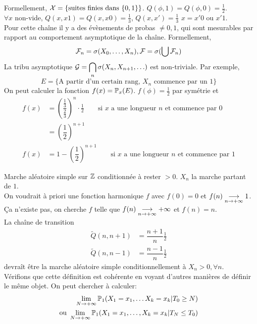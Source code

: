 \documentclass[]{report}
\begin{document}
\begin{ex}{}{}
        Formellement, $\mathcal{X}=\{\text{suites finies dans }\{0,1\}\}$. $Q(\phi,1)=Q(\phi,0)=\frac{1}{2}$.\\
        $\forall x$ non-vide, $Q(x,x1)=Q(x,x0)=\frac{1}{3}$, $Q(x,x')=\frac{1}{3}$ \ssi $x=x'0$ ou $x'1$.\\
        Pour cette chaîne il y a des évènements de probas $\neq 0,1$, qui sont mesurables par rapport au comportement asymptotique de la chaîne. Formellement,
        \[\mathcal{F}_n=\sigma(X_0,\ldots,X_n),\mathcal{F}=\sigma(\bigcup \mathcal{F}_n)\]
        La tribu asymptotique $\displaystyle{\mathcal{G}=\bigcap_n \sigma(X_n,X_{n+1},\ldots)}$ est non-triviale. Par exemple, 
        \[E=\{\text{A partir d'un certain rang, $X_n$ commence par un $1$}\}\]
        On peut calculer la fonction $f(x)=\mathbb{P}_x(E)$. $f(\phi)=\frac{1}{2}$ par symétrie et
        \begin{align*}
            f(x)&=\left(\dfrac{\frac{1}{3}}{\frac{2}{3}}\right)^n\cdot\frac{1}{2}\qquad \text{si $x$ a une longueur $n$ et commence par $0$}\\
            &=\left(\dfrac{1}{2}\right)^{n+1}\\
            f(x)&=1-\left(\dfrac{1}{2}\right)^{n+1}\qquad \text{si $x$ a une longueur $n$ et commence par $1$}
        \end{align*}
    \end{ex}

    \begin{ex}{}{}
        Marche aléatoire simple sur $\mathbb{Z}$ conditionnée à rester $>0$. $X_n$ la marche partant de $1$.\\
        On voudrait à priori une fonction harmonique $f$ avec $f(0)=0$ et $f(n)\underset{n\to +\infty}{\longrightarrow} 1$. Ça n'existe pas, on cherche $f$ telle que $f(n)\underset{n\to +\infty}{\longrightarrow} +\infty$ et $f(n)=n$.\\
        La chaîne de transition
        \begin{align*}
            \tilde{Q}(n,n+1)&=\dfrac{n+1}{n}\frac{1}{2}\\
            \tilde{Q}(n,n-1)&=\dfrac{n-1}{n}\frac{1}{2}
        \end{align*}
        devraît être la marche aléatoire simple conditionnellement à $X_n>0,\forall n$.\\
        Vérifions que cette définition est cohérente en voyant d'autres manières de définir le même objet. On peut chercher à calculer:
        \begin{align*}
            \lim_{N\to +\infty}\mathbb{P}_1(X_1=x_1,\ldots X_k=x_k|T_0\ge N)&\\
            \text{ou } \lim_{N\to +\infty}\mathbb{P}_1(X_1=x_1,\ldots,X_k=x_k|T_N\le T_0)&
        \end{align*}
    \end{ex}
\end{document}
